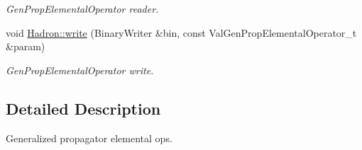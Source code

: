 \begin{DoxyCompactItemize}
\begin{DoxyCompactList}\small\item\em Gen\+Prop\+Elemental\+Operator reader. \end{DoxyCompactList}\item 
void \mbox{\hyperlink{namespaceHadron_a276bd4448f8f6233aa951856e912651e}{Hadron\+::write}} (Binary\+Writer \&bin, const Val\+Gen\+Prop\+Elemental\+Operator\+\_\+t \&param)
\begin{DoxyCompactList}\small\item\em Gen\+Prop\+Elemental\+Operator write. \end{DoxyCompactList}\end{DoxyCompactItemize}


\subsection{Detailed Description}
Generalized propagator elemental ops. 

